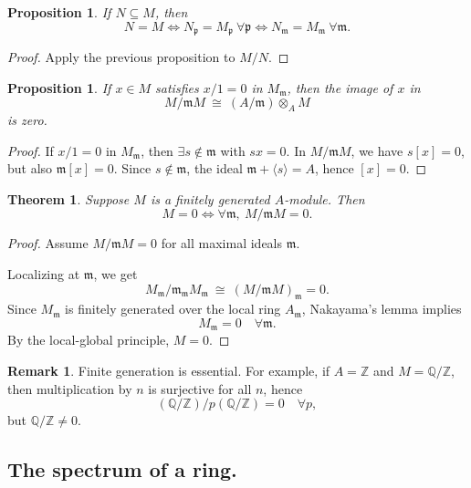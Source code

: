 \documentclass[11pt,a4paper]{article}
\theoremstyle{definition}
\newtheorem{remark}[definition]{Remark}
\theoremstyle{plain}
\newtheorem{theorem}[definition]{Theorem}
\newtheorem{proposition}[definition]{Proposition}
\theoremstyle{remark}
\newcommand{\Z}{\mathbb{Z}}
\newcommand{\Q}{\mathbb{Q}}
\begin{document}
\begin{proposition}
    If $N\subseteq M$, then
    \[
    N=M
    \iff
    N_{\mathfrak p}=M_{\mathfrak p}\ \forall\mathfrak p
    \iff
    N_{\mathfrak m}=M_{\mathfrak m}\ \forall\mathfrak m.
    \]
\end{proposition}

\begin{proof}
    Apply the previous proposition to $M/N$.
\end{proof}

\begin{proposition}
    If $x\in M$ satisfies $x/1=0$ in $M_{\mathfrak m}$, then the image of $x$ in
    \[
    M/\mathfrak m M \ \cong\ (A/\mathfrak m)\otimes_A M
    \]
    is zero.
\end{proposition}

\begin{proof}
    If $x/1=0$ in $M_{\mathfrak m}$, then $\exists s\notin\mathfrak m$ with $sx=0$.
    In $M/\mathfrak m M$, we have $s[x]=0$, but also $\mathfrak m[x]=0$.
    Since $s\notin\mathfrak m$, the ideal $\mathfrak m+\langle s\rangle=A$,
    hence $[x]=0$.
\end{proof}

\begin{theorem}
    Suppose $M$ is a finitely generated $A$-module. Then
    \[
    M=0
    \iff
    \forall\mathfrak m,\ M/\mathfrak m M=0.
    \]
\end{theorem}

\begin{proof}
    Assume $M/\mathfrak m M=0$ for all maximal ideals $\mathfrak m$.

    Localizing at $\mathfrak m$, we get
    \[
    M_{\mathfrak m}/\mathfrak m_{\mathfrak m}M_{\mathfrak m}
    \ \cong\
    (M/\mathfrak m M)_{\mathfrak m}
    =0.
    \]
    Since $M_{\mathfrak m}$ is finitely generated over the local ring $A_{\mathfrak m}$,
    Nakayama's lemma implies
    \[
    M_{\mathfrak m}=0
    \quad \forall\mathfrak m.
    \]
    By the local-global principle, $M=0$.
\end{proof}

\begin{remark}
    Finite generation is essential. For example, if $A=\Z$ and $M=\Q/\Z$, then
    multiplication by $n$ is surjective for all $n$, hence
    \[
    (\Q/\Z)/p(\Q/\Z)=0\quad \forall p,
    \]
    but $\Q/\Z\neq 0$.
\end{remark}
\subsection{The spectrum of a ring.}
\end{document}
